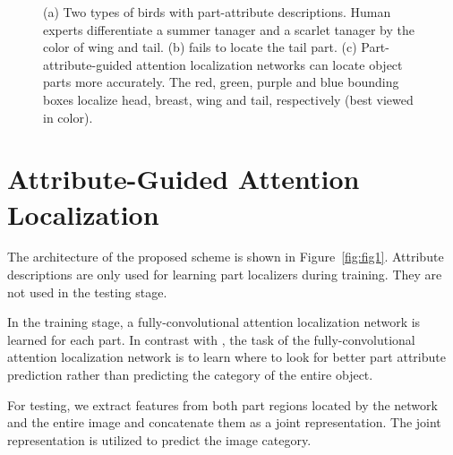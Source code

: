 \documentclass{article}
\begin{document}
\begin{figure}[!t]
\begin{center}
\begin{minipage}[b]{5cm}
{    }
    \end{minipage}
\vspace{-12pt}
\end{center}
\label{fig:fig0}
\caption{(a) Two types of birds with part-attribute descriptions. Human experts differentiate a summer tanager and a scarlet tanager by the color of wing and tail. (b) \cite{nips1} fails to locate the tail part.
(c) Part-attribute-guided attention localization networks can locate object parts more accurately. The red, green, purple and blue bounding boxes localize head, breast, wing and tail, respectively (best viewed in color). }
\end{figure}

\section{Attribute-Guided Attention Localization}
The architecture of the proposed scheme is shown in Figure~\ref{fig:fig1}.
Attribute descriptions are only used for learning part localizers during training. They are not used in the testing stage.

In the training stage, a fully-convolutional attention localization network \cite{nips1} is learned for each part.
In contrast with \cite{nips1}, the task of the fully-convolutional attention localization network is to learn where to look for better part attribute prediction rather than predicting the category of the entire object.

For testing, we extract features from both part regions located by the network and the entire image and concatenate them as a joint representation. The joint representation is utilized to predict the image category.
\end{document}

